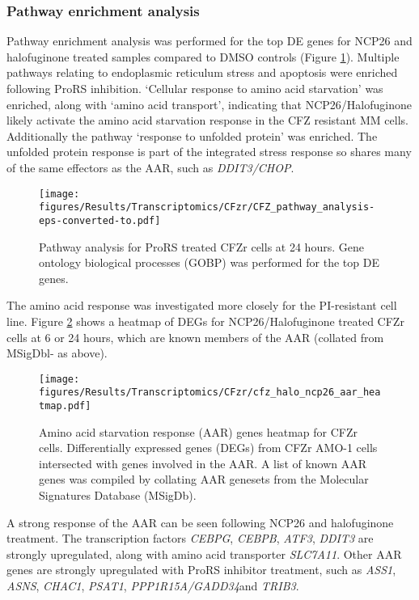 \subsubsection{Pathway enrichment analysis}
Pathway enrichment analysis was performed for the top DE genes for NCP26 and halofuginone treated samples compared to DMSO controls (Figure \ref{fig:cfz_pathway}).
Multiple pathways relating to endoplasmic reticulum stress and apoptosis were enriched following ProRS inhibition.
`Cellular response to amino acid starvation' was enriched, along with `amino acid transport', indicating that NCP26/Halofuginone likely activate the amino acid starvation response in the CFZ resistant MM cells.
Additionally the pathway `response to unfolded protein' was enriched.
The unfolded protein response is part of the integrated stress response so shares many of the same effectors as the AAR, such as \textit{DDIT3/CHOP}.

\begin{figure}[htb]
\centering
\texttt{[image: figures/Results/Transcriptomics/CFzr/CFZ\_pathway\_analysis-eps-converted-to.pdf]}
\caption[Pathway analysis for ProRS inhibitor-treated CFZr cells]{Pathway analysis for ProRS treated CFZr cells at 24 hours.
Gene ontology biological processes (GOBP) was performed for the top DE genes.
}
\label{fig:cfz_pathway}
\end{figure}
%
The amino acid response was investigated more closely for the PI-resistant cell line.
Figure \ref{fig:cfz_aar_heatmap} shows a heatmap of DEGs for NCP26/Halofuginone treated CFZr cells at 6 or 24 hours, which are known members of the AAR (collated from MSigDbl- as above).

\begin{figure}[p]
\centering
\texttt{[image: figures/Results/Transcriptomics/CFzr/cfz\_halo\_ncp26\_aar\_heatmap.pdf]}
\caption[Amino acid starvation response genes heatmap CFZr cells]{Amino acid starvation response (AAR) genes heatmap for CFZr cells.
Differentially expressed genes (DEGs) from CFZr AMO-1 cells intersected with genes involved in the AAR.
A list of known AAR genes was compiled by collating AAR genesets from the Molecular Signatures Database (MSigDb).
}
\label{fig:cfz_aar_heatmap}
\end{figure}
A strong response of the AAR can be seen following NCP26 and halofuginone treatment.
The transcription factors \textit{CEBPG}, \textit{CEBPB}, \textit{ATF3}, \textit{DDIT3} are strongly upregulated, along with amino acid transporter \textit{SLC7A11}.
Other AAR genes are strongly upregulated with ProRS inhibitor treatment, such as \textit{ASS1}, \textit{ASNS}, \textit{CHAC1}, \textit{PSAT1}, \textit{PPP1R15A/GADD34}and \textit{TRIB3}.

